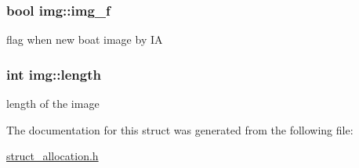 \subsubsection[{\texorpdfstring{img\+\_\+f}{img_f}}]{\setlength{\rightskip}{0pt plus 5cm}bool img\+::img\+\_\+f}\hypertarget{structimg_a81e3c13ecf3acc548884bb27ba964822}{}\label{structimg_a81e3c13ecf3acc548884bb27ba964822}
flag when new boat image by IA 
\subsubsection[{\texorpdfstring{length}{length}}]{\setlength{\rightskip}{0pt plus 5cm}int img\+::length}\hypertarget{structimg_a4d4e3f1b208a7acc1c6f3cd9f7ffaa77}{}\label{structimg_a4d4e3f1b208a7acc1c6f3cd9f7ffaa77}
length of the image 

The documentation for this struct was generated from the following file\+:\begin{DoxyCompactItemize}
\item 
\hyperlink{struct__allocation_8h}{struct\+\_\+allocation.\+h}\end{DoxyCompactItemize}
